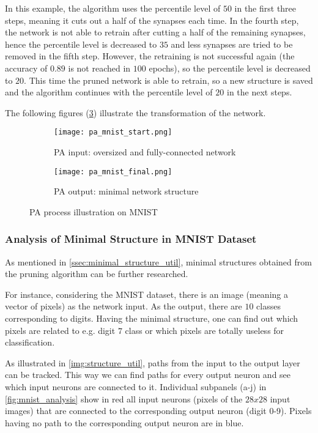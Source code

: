 In this example, the algorithm uses the percentile level of $ 50 $ in the first three steps, meaning it cuts out a half of the synapses each time. In the fourth step, the network is not able to retrain after cutting a half of the remaining synapses, hence the percentile level is decreased to $ 35 $ and less synapses are tried to be removed in the fifth step. However, the retraining is not successful again (the accuracy of $ 0.89 $ is not reached in $ 100 $ epochs), so the percentile level is decreased to $ 20 $. This time the pruned network is able to retrain, so a new structure is saved and the algorithm continues with the percentile level of $ 20 $ in the next steps.

The following figures (\ref{img:pa_mnist_morph}) illustrate the transformation of the network.
\begin{figure}[H]
\centering
\begin{subfigure}{0.4\textwidth}
  \centering
  \texttt{[image: pa\_mnist\_start.png]}
  \caption{PA input: oversized and fully-connected network}
  \label{img:pa_mnist_start}
\end{subfigure}%
\begin{subfigure}{0.4\textwidth}
  \centering
  \texttt{[image: pa\_mnist\_final.png]}
  \caption{PA output: minimal network structure}
  \label{img:pa_mnist_final}
\end{subfigure}
\caption{PA process illustration on MNIST}
\label{img:pa_mnist_morph}
\end{figure}

\subsubsection{Analysis of Minimal Structure in MNIST Dataset} \label{sssec:mnist_analysis}
As mentioned in \cref{ssec:minimal_structure_util}, minimal structures obtained from the pruning algorithm can be further researched.

For instance, considering the MNIST dataset, there is an image (meaning a vector of pixels) as the network input. As the output, there are $ 10 $ classes corresponding to digits. Having the minimal structure, one can find out which pixels are related to e.g. digit $ 7 $ class or which pixels are totally useless for classification.

As illustrated in \cref{img:structure_util}, paths from the input to the output layer can be tracked. This way we can find paths for every output neuron and see which input neurons are connected to it. Individual subpanels (a-j) in \cref{fig:mnist_analysis} show in red all input neurons (pixels of the $ 28x28 $ input images) that are connected to the corresponding output neuron (digit 0-9). Pixels having no path to the corresponding output neuron are in blue.

